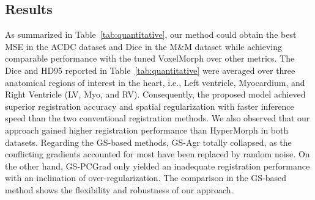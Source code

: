 \documentclass[runningheads]{llncs}
\begin{document}
\subsection{Results}
As summarized in Table~\ref{tab:quantitative}, our method could obtain the best MSE in the ACDC dataset and Dice in the M$\&$M dataset while achieving comparable performance with the tuned VoxelMorph over other metrics.
The Dice and HD95 reported in Table~\ref{tab:quantitative} were averaged over three anatomical regions of interest in the heart, i.e., Left ventricle, Myocardium, and Right Ventricle (LV, Myo, and RV). Consequently, the proposed model achieved superior registration accuracy and spatial regularization with faster inference speed than the two conventional registration methods. We also observed that our approach gained higher registration performance than HyperMorph in both datasets. Regarding the GS-based methods, GS-Agr totally collapsed, as the conflicting gradients accounted for most have been replaced by random noise. On the other hand, GS-PCGrad only yielded an inadequate registration performance with an inclination of over-regularization. The comparison in the GS-based method shows the flexibility and robustness of our approach. 
\end{document}
